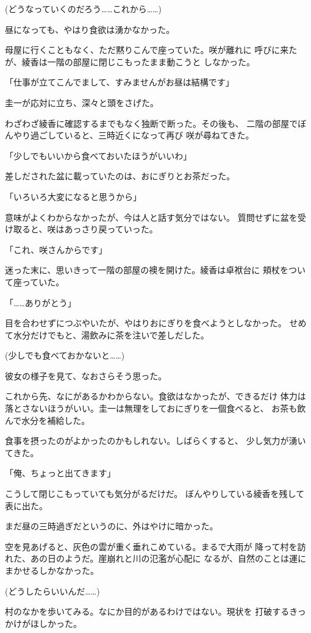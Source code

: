 ﻿\documentclass[
    book,tate,
    line_length=30zw,
    jafontsize=12pt,
    paper=b5j,
    landscape,
    ]{jlreq}
\begin{document}
(どうなっていくのだろう……これから……)

昼になっても、やはり食欲は湧かなかった。

母屋に行くこともなく、ただ黙りこんで座っていた。咲が離れに
呼びに来たが、綾香は一階の部屋に閉じこもったまま動こうと
しなかった。

「仕事が立てこんでまして、すみませんがお昼は結構です」

圭一が応対に立ち、深々と頭をさげた。

わざわざ綾香に確認するまでもなく独断で断った。その後も、
二階の部屋でぼんやり過ごしていると、三時近くになって再び
咲が尋ねてきた。

「少しでもいいから食べておいたほうがいいわ」

差しだされた盆に載っていたのは、おにぎりとお茶だった。

「いろいろ大変になると思うから」

意味がよくわからなかったが、今は人と話す気分ではない。
質問せずに盆を受け取ると、咲はあっさり戻っていった。

「これ、咲さんからです」

迷った末に、思いきって一階の部屋の襖を開けた。綾香は卓袱台に
頬杖をついて座っていた。

「……ありがとう」

目を合わせずにつぶやいたが、やはりおにぎりを食べようとしなかった。
せめて水分だけでもと、湯飲みに茶を注いで差しだした。

(少しでも食べておかないと……)

彼女の様子を見て、なおさらそう思った。

これから先、なにがあるかわからない。食欲はなかったが、できるだけ
体力は落とさないほうがいい。圭一は無理をしておにぎりを一個食べると、
お茶も飲んで水分を補給した。

食事を摂ったのがよかったのかもしれない。しばらくすると、
少し気力が湧いてきた。

「俺、ちょっと出てきます」

こうして閉じこもっていても気分がるだけだ。
ぼんやりしている綾香を残して表に出た。

まだ昼の三時過ぎだというのに、外はやけに暗かった。

空を見あげると、灰色の雲が重く垂れこめている。まるで大雨が
降って村を訪れた、あの日のようだ。崖崩れと川の氾濫が心配に
なるが、自然のことは運にまかせるしかなかった。

(どうしたらいいんだ……)

村のなかを歩いてみる。なにか目的があるわけではない。現状を
打破するきっかけがほしかった。
\end{document}
